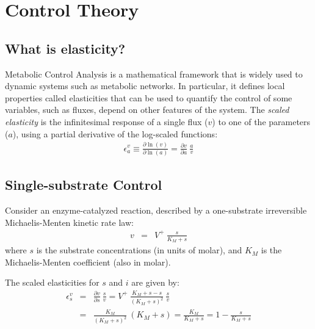 \documentclass[12pt,a4paper]{article}
\begin{document}
\section{Control Theory}
\subsection{What is elasticity?}
Metabolic Control Analysis \cite{Fell1996-be} is a mathematical framework that is widely used to dynamic systems such as metabolic networks. In particular, it defines local properties called elasticities that can be used to quantify the control of some variables, such as fluxes, depend on other features of the system. The \emph{scaled elasticity} is the infinitesimal response of a single flux ($v$) to one of the parameters ($a$), using a partial derivative of the log-scaled functions:
\begin{eqnarray}
    \epsilon_a^v \equiv \frac{\partial \ln(v)}{\partial \ln(a)} = \frac{\partial v}{\partial a} ~ \frac{a}{v}
\end{eqnarray}

\subsection{Single-substrate Control}
Consider an enzyme-catalyzed reaction, described by a one-substrate irreversible Michaelis-Menten kinetic rate law:
\begin{eqnarray}
    v &=& V^+ ~ \frac{s}{K_M + s}
\end{eqnarray}
where $s$ is the substrate concentrations (in units of molar), and $K_M$ is the Michaelis-Menten coefficient (also in molar).

\begin{center}
\end{center}

The scaled elasticities for $s$ and $i$ are given by:
\begin{eqnarray}
    \epsilon_s^v &=& \frac{\partial v}{\partial s} ~ \frac{s}{v} = V^+ ~ \frac{K_M + s - s}{(K_M + s)^2} ~ \frac{s}{v} \nonumber \\
    &=& \frac{K_M}{(K_M + s)^2} ~ (K_M + s) = \frac{K_M}{K_M + s} = 1 - \frac{s}{K_M + s}\label{eq:eps_s_v_irr}
\end{eqnarray}
\end{document}
